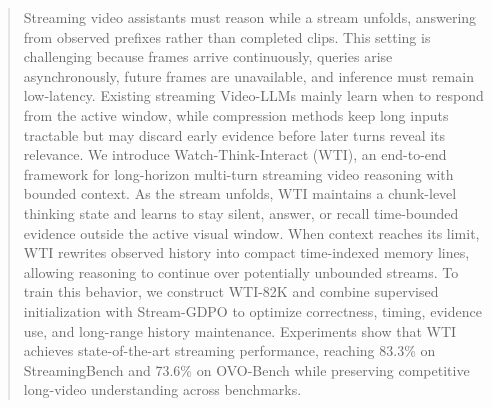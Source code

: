 \begin{abstract}
Streaming video assistants must reason while a stream unfolds, answering from observed prefixes rather than completed clips.
This setting is challenging because frames arrive continuously, queries arise asynchronously, future frames are unavailable, and inference must remain low-latency.
Existing streaming Video-LLMs mainly learn when to respond from the active window, while compression methods keep long inputs tractable but may discard early evidence before later turns reveal its relevance.
We introduce Watch-Think-Interact (WTI), an end-to-end framework for long-horizon multi-turn streaming video reasoning with bounded context.
As the stream unfolds, WTI maintains a chunk-level thinking state and learns to stay silent, answer, or recall time-bounded evidence outside the active visual window.
When context reaches its limit, WTI rewrites observed history into compact time-indexed memory lines, allowing reasoning to continue over potentially unbounded streams.
To train this behavior, we construct WTI-82K and combine supervised initialization with Stream-GDPO to optimize correctness, timing, evidence use, and long-range history maintenance.
Experiments show that WTI achieves state-of-the-art streaming performance, reaching 83.3\% on StreamingBench and 73.6\% on OVO-Bench while preserving competitive long-video understanding across benchmarks.
\end{abstract}
